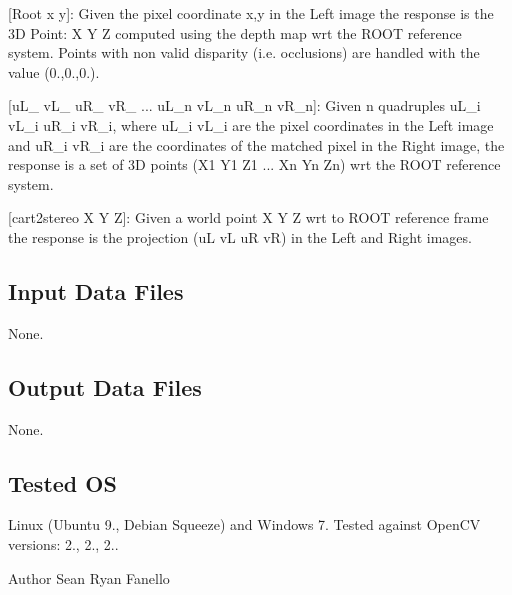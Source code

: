 \begin{DoxyItemize}
\begin{DoxyItemize}
\item \mbox{[}Root x y\mbox{]}\+: Given the pixel coordinate x,y in the Left image the response is the 3\+D Point\+: X Y Z computed using the depth map wrt the R\+O\+O\+T reference system. Points with non valid disparity (i.\+e. occlusions) are handled with the value (0.,0.,0.).
\item \mbox{[}u\+L\+\_ v\+L\+\_ u\+R\+\_ v\+R\+\_ ... u\+L\+\_\+n v\+L\+\_\+n u\+R\+\_\+n v\+R\+\_\+n\mbox{]}\+: Given n quadruples u\+L\+\_\+i v\+L\+\_\+i u\+R\+\_\+i v\+R\+\_\+i, where u\+L\+\_\+i v\+L\+\_\+i are the pixel coordinates in the Left image and u\+R\+\_\+i v\+R\+\_\+i are the coordinates of the matched pixel in the Right image, the response is a set of 3\+D points (X1 Y1 Z1 ... Xn Yn Zn) wrt the R\+O\+O\+T reference system.
\item \mbox{[}cart2stereo X Y Z\mbox{]}\+: Given a world point X Y Z wrt to R\+O\+O\+T reference frame the response is the projection (u\+L v\+L u\+R v\+R) in the Left and Right images.
\end{DoxyItemize}
\end{DoxyItemize}\hypertarget{group__SFM_in_files_sec}{}\subsection{Input Data Files}\label{group__SFM_in_files_sec}
None.\hypertarget{group__SFM_out_data_sec}{}\subsection{Output Data Files}\label{group__SFM_out_data_sec}
None.\hypertarget{group__SFM_tested_os_sec}{}\subsection{Tested O\+S}\label{group__SFM_tested_os_sec}
Linux (Ubuntu 9., Debian Squeeze) and Windows 7. Tested against Open\+C\+V versions\+: 2., 2., 2..

\begin{DoxyAuthor}{Author}
Sean Ryan Fanello 
\end{DoxyAuthor}
